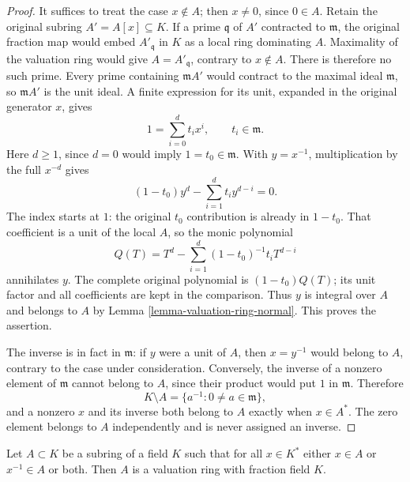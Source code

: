 \begin{proof}
It suffices to treat the case
$x\notin A$; then $x\neq0$,
since $0\in A$. Retain the
original subring $A'=A[x]\subseteq K$.
If a prime $\mathfrak q$ of
$A'$ contracted to $\mathfrak m$,
the original fraction map would
embed $A'_{\mathfrak q}$ in $K$
as a local ring dominating
$A$. Maximality of the valuation
ring would give $A=A'_{\mathfrak q}$,
contrary to $x\notin A$.
There is therefore no such
prime. Every prime containing
$\mathfrak m A'$ would contract
to the maximal ideal $\mathfrak m$,
so $\mathfrak m A'$ is the
unit ideal. A finite expression
for its unit, expanded in
the original generator $x$,
gives
$$
1=\sum_{i=0}^d t_i x^i,\qquad t_i\in\mathfrak m.
$$
Here $d\geq1$, since $d=0$
would imply $1=t_0\in\mathfrak m$.
With $y=x^{-1}$, multiplication
by the full $x^{-d}$ gives
$$
(1-t_0)y^d-\sum_{i=1}^d t_i y^{d-i}=0.
$$
The index starts at $1$:
the original $t_0$ contribution
is already in $1-t_0$.
That coefficient is a unit
of the local $A$, so the
monic polynomial
$$
Q(T)=T^d-\sum_{i=1}^d(1-t_0)^{-1}t_iT^{d-i}
$$
annihilates $y$. The complete
original polynomial is
$(1-t_0)Q(T)$; its unit
factor and all coefficients
are kept in the comparison.
Thus $y$ is integral over
$A$ and belongs to $A$ by
Lemma \ref{lemma-valuation-ring-normal}.
This proves the assertion.

The inverse is in fact in
$\mathfrak m$: if $y$ were
a unit of $A$, then
$x=y^{-1}$ would belong to
$A$, contrary to the case
under consideration. Conversely,
the inverse of a nonzero
element of $\mathfrak m$
cannot belong to $A$, since
their product would put $1$
in $\mathfrak m$. Therefore
$$
K\setminus A=\{a^{-1}:0\neq a\in\mathfrak m\},
$$
and a nonzero $x$ and its
inverse both belong to $A$
exactly when $x\in A^*$.
The zero element belongs to
$A$ independently and is
never assigned an inverse.
\end{proof}

\begin{lemma}
\label{lemma-x-or-x-inverse-valuation-ring}
Let $A \subset K$ be a subring of a field $K$ such that for all
$x \in K^*$ either $x \in A$ or $x^{-1} \in A$ or both.
Then $A$ is a valuation ring with fraction field $K$.
\end{lemma}

